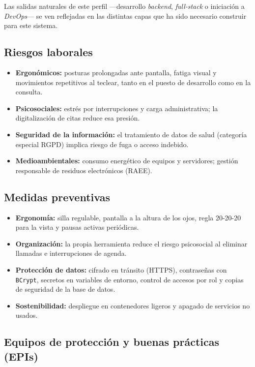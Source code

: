 \documentclass[12pt,a4paper]{report}
\begin{document}
Las salidas naturales de este perfil —desarrollo \emph{backend}, \emph{full-stack} o iniciación a \emph{DevOps}— se ven reflejadas en las distintas capas que ha sido necesario construir para este sistema.

\subsection{Riesgos laborales}

\begin{itemize}
  \item \textbf{Ergonómicos:} posturas prolongadas ante pantalla, fatiga visual y movimientos repetitivos al teclear, tanto en el puesto de desarrollo como en la consulta.
  \item \textbf{Psicosociales:} estrés por interrupciones y carga administrativa; la digitalización de citas reduce esa presión.
  \item \textbf{Seguridad de la información:} el tratamiento de datos de salud (categoría especial RGPD) implica riesgo de fuga o acceso indebido.
  \item \textbf{Medioambientales:} consumo energético de equipos y servidores; gestión responsable de residuos electrónicos (RAEE).
\end{itemize}

\subsection{Medidas preventivas}

\begin{itemize}
  \item \textbf{Ergonomía:} silla regulable, pantalla a la altura de los ojos, regla 20-20-20 para la vista y pausas activas periódicas.
  \item \textbf{Organización:} la propia herramienta reduce el riesgo psicosocial al eliminar llamadas e interrupciones de agenda.
  \item \textbf{Protección de datos:} cifrado en tránsito (HTTPS), contraseñas con \texttt{BCrypt}, secretos en variables de entorno, control de accesos por rol y copias de seguridad de la base de datos.
  \item \textbf{Sostenibilidad:} despliegue en contenedores ligeros y apagado de servicios no usados.
\end{itemize}

\subsection{Equipos de protección y buenas prácticas (EPIs)}
\end{document}
